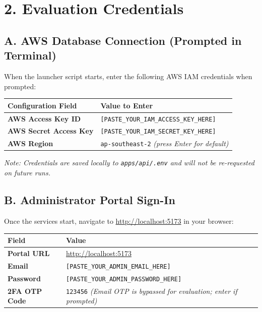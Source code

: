\documentclass[11pt,a4paper]{article}
\begin{document}
\vspace{0.4em}

\section*{2. Evaluation Credentials}

\subsection*{A. AWS Database Connection (Prompted in Terminal)}
When the launcher script starts, enter the following AWS IAM credentials when prompted:
\vspace{0.3em}
\begin{center}
\begin{tabularx}{\textwidth}{l X}
\toprule
\textbf{Configuration Field} & \textbf{Value to Enter} \\
\midrule
\textbf{AWS Access Key ID} & \texttt{[PASTE\_YOUR\_IAM\_ACCESS\_KEY\_HERE]} \\
\textbf{AWS Secret Access Key} & \texttt{[PASTE\_YOUR\_IAM\_SECRET\_KEY\_HERE]} \\
\textbf{AWS Region} & \texttt{ap-southeast-2} \textit{(press Enter for default)} \\
\bottomrule
\end{tabularx}
\end{center}
\vspace{-0.2em}
\textit{\small Note: Credentials are saved locally to \texttt{apps/api/.env} and will not be re-requested on future runs.}

\subsection*{B. Administrator Portal Sign-In}
Once the services start, navigate to \url{http://localhost:5173} in your browser:
\vspace{0.3em}
\begin{center}
\begin{tabularx}{\textwidth}{l X}
\toprule
\textbf{Field} & \textbf{Value} \\
\midrule
\textbf{Portal URL} & \url{http://localhost:5173} \\
\textbf{Email} & \texttt{[PASTE\_YOUR\_ADMIN\_EMAIL\_HERE]} \\
\textbf{Password} & \texttt{[PASTE\_YOUR\_ADMIN\_PASSWORD\_HERE]} \\
\textbf{2FA OTP Code} & \texttt{123456} \textit{(Email OTP is bypassed for evaluation; enter if prompted)} \\
\bottomrule
\end{tabularx}
\end{center}
\end{document}
